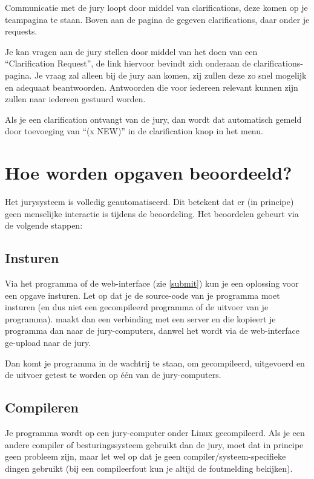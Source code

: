 Communicatie met de jury loopt door middel van clarifications, deze
komen op je teampagina te staan.  Boven aan de pagina de gegeven
clarifications, daar onder je requests.

Je kan vragen aan de jury stellen door middel van het doen van een
``Clarification Request'', de link hiervoor bevindt zich onderaan de
clarifications-pagina.  Je vraag zal alleen bij de jury aan komen, zij
zullen deze zo snel mogelijk en adequaat beantwoorden. Antwoorden die
voor iedereen relevant kunnen zijn zullen naar iedereen gestuurd worden.

Als je een clarification ontvangt van de jury, dan wordt dat
automatisch gemeld door toevoeging van ``(x NEW)'' in de clarification
knop in het menu.

\section{Hoe worden opgaven beoordeeld?}

Het \DOMjudge jurysysteem is volledig geautomatiseerd. Dit betekent
dat er (in principe) geen menselijke interactie is tijdens de
beoordeling. Het beoordelen gebeurt via de volgende stappen:

\subsection{Insturen}

Via het  programma of de web-interface (zie \ref{submit})
kun je een oplossing voor een opgave insturen. Let op dat je de
source-code van je programma moet insturen (en dus niet een
gecompileerd programma of de uitvoer van je programma). 
maakt dan een verbinding met een server en die kopieert je programma
dan naar de jury-computers, danwel het wordt via de web-interface
ge-upload naar de jury.

Dan komt je programma in de wachtrij te staan, om gecompileerd,
uitgevoerd en de uitvoer getest te worden op \'e\'en van de
jury-computers.

\subsection{Compileren}

Je programma wordt op een jury-computer onder Linux gecompileerd.
Als je een andere compiler of besturingssysteem gebruikt dan de jury,
moet dat in principe geen probleem zijn, maar let wel op dat
je geen compiler/systeem-specifieke dingen gebruikt (bij een
compileerfout kun je altijd de foutmelding bekijken).

